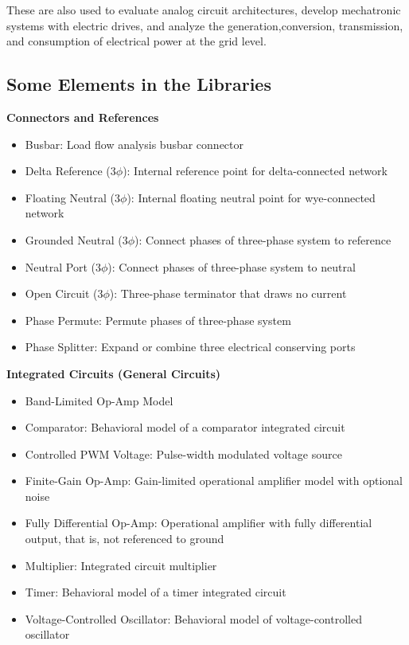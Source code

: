 \documentclass[a4paper,12pt]{article}
\begin{document}
    These are also used to evaluate analog circuit architectures,​ develop mechatronic 
    systems with electric drives,​ and analyze the generation,​ conversion,​ 
    transmission,​ and consumption of electrical power at the grid level.

    \subsection{Some Elements in the Libraries}
    {\bf Connectors and References​}
    \begin{itemize}
      \item Busbar: Load flow analysis busbar connector
      \item Delta Reference (3$\phi$): Internal reference point for delta-connected network
      \item Floating Neutral (3$\phi$): Internal floating neutral point for wye-connected network
      \item Grounded Neutral (3$\phi$): Connect phases of three-phase system to reference
      \item Neutral Port (3$\phi$): Connect phases of three-phase system to neutral
      \item Open Circuit (3$\phi$): Three-phase terminator that draws no current
      \item Phase Permute: Permute phases of three-phase system
      \item Phase Splitter: Expand or combine three electrical conserving ports
    \end{itemize}
    {\bf Integrated Circuits (General Circuits​)}
    \begin{itemize}
      \item Band-Limited Op-Amp	Model
      \item Comparator: Behavioral model of a comparator integrated circuit
      \item Controlled PWM Voltage: Pulse-width modulated voltage source
      \item Finite-Gain Op-Amp: Gain-limited operational amplifier model with optional noise
      \item Fully Differential Op-Amp: Operational amplifier with fully differential output, that is, not referenced to ground
      \item Multiplier: Integrated circuit multiplier
      \item Timer: Behavioral model of a timer integrated circuit
      \item Voltage-Controlled Oscillator: Behavioral model of voltage-controlled oscillator
    \end{itemize}
\end{document}
